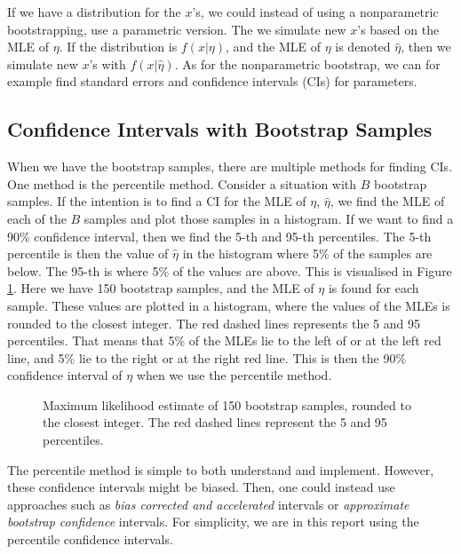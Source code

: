 If we have a distribution for the $x$'s, we could instead of using a nonparametric bootstrapping, use a parametric version. The we simulate new $x$'s based on the MLE of $\eta$. If the distribution is $f(x|\eta)$, and the MLE of $\eta$ is denoted $\hat{\eta}$, then we simulate new $x$'s with $f(x|\hat{\eta})$. As for the nonparametric bootstrap, we can for example find standard errors and confidence intervals (CIs) for parameters. 

\subsection{Confidence Intervals with Bootstrap Samples}
When we have the bootstrap samples, there are multiple methods for finding CIs. One method is the percentile method. Consider a situation with $B$ bootstrap samples. If the intention is to find a CI for the MLE of $\eta$, $\hat{\eta}$, we find the MLE of each of the $B$ samples and plot those samples in a histogram. If we want to find a 90\% confidence interval, then we find the 5-th and 95-th percentiles. The 5-th percentile is then the value of $\hat{\eta}$ in the histogram where 5\% of the samples are below. The 95-th is where 5\% of the values are above. This is visualised in Figure \ref{percentile_ci_example}. Here we have 150 bootstrap samples, and the MLE of $\eta$ is found for each sample. These values are plotted in a histogram, where the values of the MLEs is rounded to the closest integer. The red dashed lines represents the 5 and 95 percentiles. That means that 5\% of the MLEs lie to the left of or at the left red line, and 5\% lie to the right or at the right red line. This is then the 90\% confidence interval of $\eta$ when we use the percentile method.
\begin{figure}
    \centering
    
    \caption{Maximum likelihood estimate of 150 bootstrap samples, rounded to the closest integer. The red dashed lines represent the 5 and 95 percentiles.}
    \label{percentile_ci_example}
\end{figure}

The percentile method is simple to both understand and implement. However, these confidence intervals might be biased. Then, one could instead use approaches such as \textit{bias corrected and accelerated} intervals or \textit{approximate bootstrap confidence} intervals. For simplicity, we are in this report using the percentile confidence intervals. 
